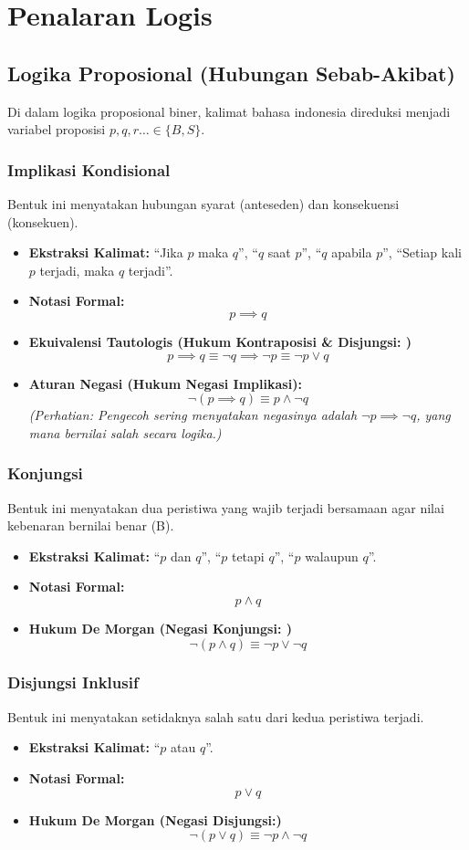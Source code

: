 \section{Penalaran Logis}
\subsection{Logika Proposional (Hubungan Sebab-Akibat)}
Di dalam logika proposional biner, kalimat bahasa indonesia direduksi menjadi variabel proposisi $p, q, r \dots \in \{B, S\}$.

\subsubsection{Implikasi Kondisional}
Bentuk ini menyatakan hubungan syarat (anteseden) dan konsekuensi (konsekuen).
\begin{itemize}
\item \textbf{Ekstraksi Kalimat: } ``Jika $p$ maka $q$'', ``$q$ saat $p$'', ``$q$ apabila $p$'', ``Setiap kali $p$ terjadi, maka $q$ terjadi''.
\item \textbf{Notasi Formal: } \[p \implies q \]
\item \textbf{Ekuivalensi Tautologis (Hukum Kontraposisi \& Disjungsi: )} \[p \implies q \equiv \neg q \implies \neg p \equiv \neg p \lor q \]
\item \textbf{Aturan Negasi (Hukum Negasi Implikasi): } \[ \neg (p \implies q) \equiv p \land \neg q \]
\textit{(Perhatian: Pengecoh sering menyatakan negasinya adalah $\neg p \implies \neg q$, yang mana bernilai salah secara logika.)}
\end{itemize}

\subsubsection{Konjungsi}
Bentuk ini menyatakan dua peristiwa yang wajib terjadi bersamaan agar nilai kebenaran bernilai benar (B).
\begin{itemize}
\item \textbf{Ekstraksi Kalimat: } ``$p$ dan $q$'', ``$p$ tetapi $q$'', ``$p$ walaupun $q$''.
\item \textbf{Notasi Formal: } \[p \land q\]
  \item \textbf{Hukum De Morgan (Negasi Konjungsi: )} \[ \neg (p \land q) \equiv \neg p \lor \neg q \]
\end{itemize}

\subsubsection{Disjungsi Inklusif}
Bentuk ini menyatakan setidaknya salah satu dari kedua peristiwa terjadi.
\begin{itemize}
\item \textbf{Ekstraksi Kalimat: } ``$p$ atau $q$''.
\item \textbf{Notasi Formal: } \[p \lor q\]
\item \textbf{Hukum De Morgan (Negasi Disjungsi:) } \[ \neg (p \lor q) \equiv \neg p \land \neg q \]
\end{itemize}

